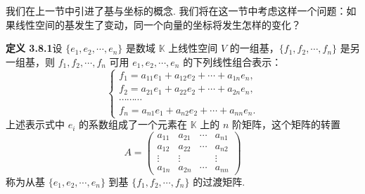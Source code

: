 \documentclass[UTF8,12pt,a4paper,fontset=fandol]{ctexart}
\begin{document}
我们在上一节中引进了基与坐标的概念. 我们将在这一节中考虑这样一个问题：如果线性空间的基发生了变动，同一个向量的坐标将发生怎样的变化？

\noindent\textbf{定义 3.8.1}\quad 设 $\{e_1,e_2,\cdots,e_n\}$ 是数域 $\mathbb{K}$ 上线性空间 $V$ 的一组基，$\{f_1,f_2,\cdots,f_n\}$ 是另一组基，则 $f_1,f_2,\cdots,f_n$ 可用 $e_1,e_2,\cdots,e_n$ 的下列线性组合表示：
\begin{equation}
\left\{\begin{array}{l}
f_1=a_{11}e_1+a_{12}e_2+\cdots+a_{1n}e_n,\\
f_2=a_{21}e_1+a_{22}e_2+\cdots+a_{2n}e_n,\\
\cdots\cdots\cdots\\
f_n=a_{n1}e_1+a_{n2}e_2+\cdots+a_{nn}e_n.
\end{array}\right.
\tag{3.8.1}
\end{equation}
上述表示式中 $e_i$ 的系数组成了一个元素在 $\mathbb{K}$ 上的 $n$ 阶矩阵，这个矩阵的转置
\[
A=\left(\begin{array}{cccc}
a_{11}&a_{21}&\cdots&a_{n1}\\
a_{12}&a_{22}&\cdots&a_{n2}\\
\vdots&\vdots&&\vdots\\
a_{1n}&a_{2n}&\cdots&a_{nn}
\end{array}\right)
\]
称为从基 $\{e_1,e_2,\cdots,e_n\}$ 到基 $\{f_1,f_2,\cdots,f_n\}$ 的过渡矩阵.
\end{document}
